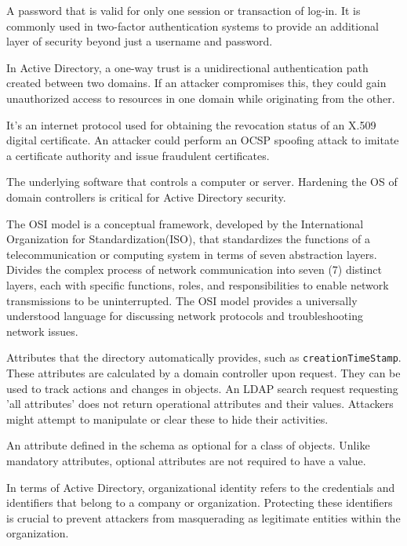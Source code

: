  A password that is valid for only one session or transaction of log-in. It is commonly used in two-factor authentication systems to provide an additional layer of security beyond just a username and password.

 In Active Directory, a one-way trust is a unidirectional authentication path created between two domains. If an attacker compromises this, they could gain unauthorized access to resources in one domain while originating from the other.

 It’s an internet protocol used for obtaining the revocation status of an X.509 digital certificate. An attacker could perform an OCSP spoofing attack to imitate a certificate authority and issue fraudulent certificates.

 The underlying software that controls a computer or server. Hardening the OS of domain controllers is critical for Active Directory security.

 The OSI model is a conceptual framework, developed by the International Organization for Standardization(ISO), that standardizes the functions of a telecommunication or computing system in terms of seven abstraction layers. Divides the complex process of network communication into seven (7) distinct layers, each with specific functions, roles, and responsibilities to enable network transmissions to be uninterrupted. The OSI model provides a universally understood language for discussing network protocols and troubleshooting network issues.

 Attributes that the directory automatically provides, such as \texttt{creationTimeStamp}. These attributes are calculated by a domain controller upon request. They can be used to track actions and changes in objects. An LDAP search request requesting 'all attributes' does not return operational attributes and their values. Attackers might attempt to manipulate or clear these to hide their activities.

 An attribute defined in the schema as optional for a class of objects. Unlike mandatory attributes, optional attributes are not required to have a value.

 In terms of Active Directory, organizational identity refers to the credentials and identifiers that belong to a company or organization. Protecting these identifiers is crucial to prevent attackers from masquerading as legitimate entities within the organization.

